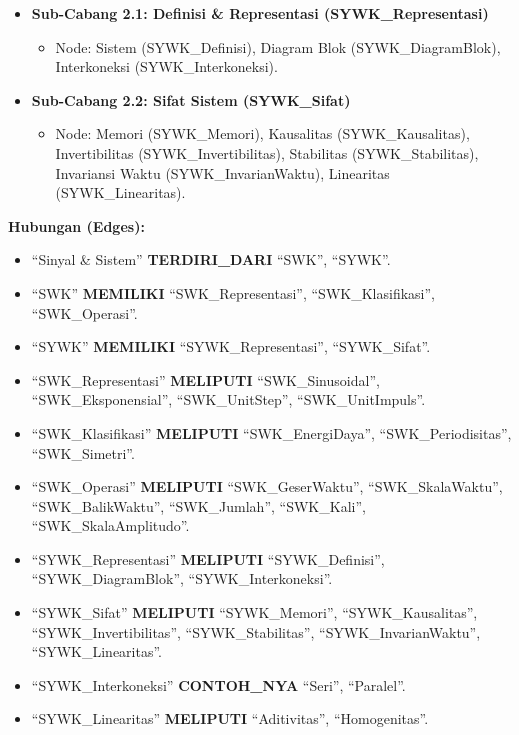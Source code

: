 \documentclass[
  letterpaper,
  DIV=11,
  numbers=noendperiod]{scrreprt}
\providecommand{\tightlist}{%
  \setlength{\itemsep}{0pt}\setlength{\parskip}{0pt}}
\begin{document}
\begin{itemize}
  \begin{itemize}
  \tightlist
  \item
    \textbf{Sub-Cabang 2.1: Definisi \& Representasi
    (SYWK\_Representasi)}

    \begin{itemize}
    \tightlist
    \item
      Node: Sistem (SYWK\_Definisi), Diagram Blok (SYWK\_DiagramBlok),
      Interkoneksi (SYWK\_Interkoneksi).
    \end{itemize}
  \item
    \textbf{Sub-Cabang 2.2: Sifat Sistem (SYWK\_Sifat)}

    \begin{itemize}
    \tightlist
    \item
      Node: Memori (SYWK\_Memori), Kausalitas (SYWK\_Kausalitas),
      Invertibilitas (SYWK\_Invertibilitas), Stabilitas
      (SYWK\_Stabilitas), Invariansi Waktu (SYWK\_InvarianWaktu),
      Linearitas (SYWK\_Linearitas).
    \end{itemize}
  \end{itemize}
\end{itemize}

\textbf{Hubungan (Edges):}

\begin{itemize}
\tightlist
\item
  ``Sinyal \& Sistem'' \textbf{TERDIRI\_DARI} ``SWK'', ``SYWK''.
\item
  ``SWK'' \textbf{MEMILIKI} ``SWK\_Representasi'', ``SWK\_Klasifikasi'',
  ``SWK\_Operasi''.
\item
  ``SYWK'' \textbf{MEMILIKI} ``SYWK\_Representasi'', ``SYWK\_Sifat''.
\item
  ``SWK\_Representasi'' \textbf{MELIPUTI} ``SWK\_Sinusoidal'',
  ``SWK\_Eksponensial'', ``SWK\_UnitStep'', ``SWK\_UnitImpuls''.
\item
  ``SWK\_Klasifikasi'' \textbf{MELIPUTI} ``SWK\_EnergiDaya'',
  ``SWK\_Periodisitas'', ``SWK\_Simetri''.
\item
  ``SWK\_Operasi'' \textbf{MELIPUTI} ``SWK\_GeserWaktu'',
  ``SWK\_SkalaWaktu'', ``SWK\_BalikWaktu'', ``SWK\_Jumlah'',
  ``SWK\_Kali'', ``SWK\_SkalaAmplitudo''.
\item
  ``SYWK\_Representasi'' \textbf{MELIPUTI} ``SYWK\_Definisi'',
  ``SYWK\_DiagramBlok'', ``SYWK\_Interkoneksi''.
\item
  ``SYWK\_Sifat'' \textbf{MELIPUTI} ``SYWK\_Memori'',
  ``SYWK\_Kausalitas'', ``SYWK\_Invertibilitas'', ``SYWK\_Stabilitas'',
  ``SYWK\_InvarianWaktu'', ``SYWK\_Linearitas''.
\item
  ``SYWK\_Interkoneksi'' \textbf{CONTOH\_NYA} ``Seri'', ``Paralel''.
\item
  ``SYWK\_Linearitas'' \textbf{MELIPUTI} ``Aditivitas'',
  ``Homogenitas''.
\end{itemize}
\end{document}
